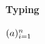 \documentclass[acmsmall,screen,nonacm]{acmart}
\begin{document}
\paragraph{Typing}








\newcommand{\vparens}[1]{\mathop{\parens{#1}}\limits}

$(a){}_{i=1}^n$
\end{document}
